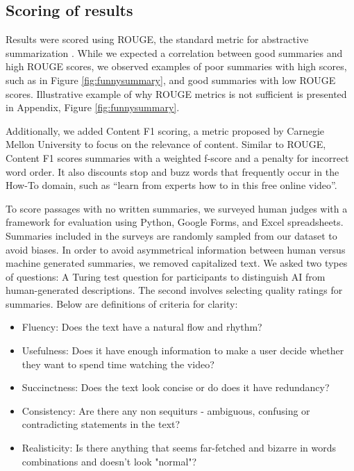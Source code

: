 \documentclass[sigconf]{acmart}
\begin{document}
\subsection{Scoring of results}
\label{Scoring}
Results were scored using ROUGE, the standard metric for abstractive summarization {\cite{lin-2004-rouge}}. While we expected a correlation between good summaries and high ROUGE scores, we observed examples of poor summaries with high scores, such as in Figure \ref{fig:funnysummary}, and good summaries with low ROUGE scores.  Illustrative example of why ROUGE metrics is not sufficient is presented in Appendix, Figure \ref{fig:funnysummary}.


Additionally, we added Content F1 scoring, a metric proposed by Carnegie Mellon University {\cite{denkowski:lavie:meteor-wmt:2014}} to focus on the relevance of content. Similar to ROUGE, Content F1 scores summaries with a weighted f-score and a penalty for incorrect word order. It also discounts stop and buzz words that frequently occur in the How-To domain, such as “learn from experts how to in this free online video”.  

To score passages with no written summaries, we surveyed human judges with a framework for evaluation using Python, Google Forms, and Excel spreadsheets. Summaries included in the surveys are randomly sampled from our dataset to avoid biases. In order to avoid asymmetrical information between human versus machine generated summaries, we removed capitalized text. We asked two types of questions: A Turing test question for participants to distinguish AI from human-generated descriptions. The second involves selecting quality ratings for summaries. Below are definitions of criteria for clarity:
\begin{itemize}

\item Fluency: Does the text have a natural flow and rhythm?
\item Usefulness: Does it have enough information to make a user decide whether they want to spend time watching the video?
\item Succinctness: Does the text look concise or do does it have redundancy?
\item Consistency: Are there any non sequiturs - ambiguous, confusing or contradicting statements in the text?
\item Realisticity: Is there anything that seems far-fetched and bizarre in words combinations and doesn't look "normal"?

\end{itemize}
\end{document}
